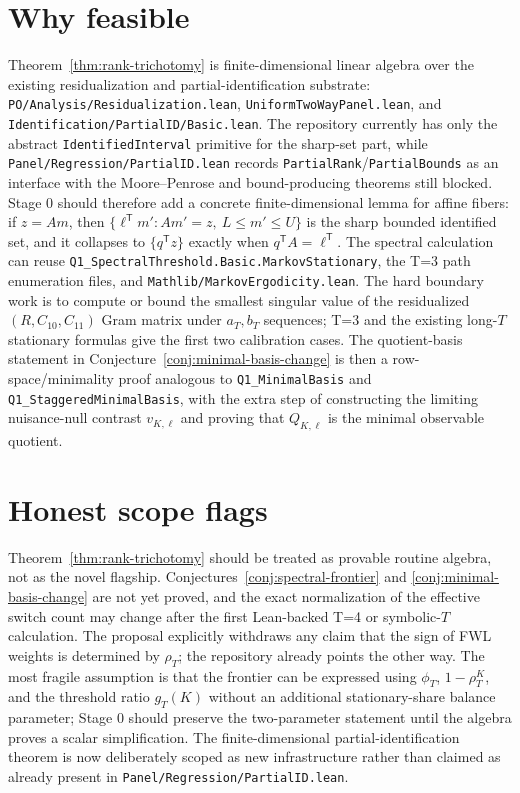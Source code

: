 \documentclass[11pt]{article}
\newcommand{\transpose}{\mathsf{T}}
\theoremstyle{definition}
\theoremstyle{plain}
\theoremstyle{remark}
\begin{document}
\section{Why feasible}
Theorem~\ref{thm:rank-trichotomy} is finite-dimensional linear algebra over the existing residualization and partial-identification substrate: \texttt{PO/Analysis/Residualization.lean}, \texttt{UniformTwoWayPanel.lean}, and \texttt{Identification/PartialID/Basic.lean}.
The repository currently has only the abstract \texttt{IdentifiedInterval} primitive for the sharp-set part, while \texttt{Panel/Regression/PartialID.lean} records \texttt{PartialRank}/\texttt{PartialBounds} as an interface with the Moore--Penrose and bound-producing theorems still blocked.
Stage 0 should therefore add a concrete finite-dimensional lemma for affine fibers: if \(z=Am\), then \(\{\ell^\transpose m':Am'=z,\ L\le m'\le U\}\) is the sharp bounded identified set, and it collapses to \(\{q^\transpose z\}\) exactly when \(q^\transpose A=\ell^\transpose\).
The spectral calculation can reuse \texttt{Q1\_SpectralThreshold.Basic.MarkovStationary}, the T=3 path enumeration files, and \texttt{Mathlib/MarkovErgodicity.lean}.
The hard boundary work is to compute or bound the smallest singular value of the residualized \((R,C_{10},C_{11})\) Gram matrix under \(a_T,b_T\) sequences; T=3 and the existing long-\(T\) stationary formulas give the first two calibration cases.
The quotient-basis statement in Conjecture~\ref{conj:minimal-basis-change} is then a row-space/minimality proof analogous to \texttt{Q1\_MinimalBasis} and \texttt{Q1\_StaggeredMinimalBasis}, with the extra step of constructing the limiting nuisance-null contrast \(v_{K,\ell}\) and proving that \(Q_{K,\ell}\) is the minimal observable quotient.

\section{Honest scope flags}
Theorem~\ref{thm:rank-trichotomy} should be treated as provable routine algebra, not as the novel flagship.
Conjectures~\ref{conj:spectral-frontier} and \ref{conj:minimal-basis-change} are not yet proved, and the exact normalization of the effective switch count may change after the first Lean-backed T=4 or symbolic-\(T\) calculation.
The proposal explicitly withdraws any claim that the sign of FWL weights is determined by \(\rho_T\); the repository already points the other way.
The most fragile assumption is that the frontier can be expressed using \(\phi_T\), \(1-\rho_T^K\), and the threshold ratio \(g_T(K)\) without an additional stationary-share balance parameter; Stage 0 should preserve the two-parameter statement until the algebra proves a scalar simplification.
The finite-dimensional partial-identification theorem is now deliberately scoped as new infrastructure rather than claimed as already present in \texttt{Panel/Regression/PartialID.lean}.
\end{document}
